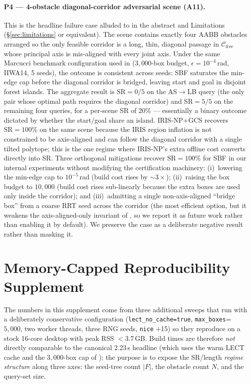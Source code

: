 \documentclass[journal]{IEEEtran}
\newcommand{\Cfree}{\mathcal{C}_{\mathrm{free}}}
\begin{document}
\paragraph{P4 — 4-obstacle diagonal-corridor adversarial scene (A11).}
This is the headline failure case alluded to in the abstract and
Limitations (\S\ref{sec:limitations} or equivalent). The scene
contains exactly four AABB obstacles arranged so the only feasible
corridor is a long, thin, diagonal passage in $\Cfree$ whose principal
axis is mis-aligned with every joint axis. Under the same Marcucci
benchmark configuration used in 
($3{,}000$-box budget, $\epsilon=10^{-4}$\,rad, IIWA14, 5 seeds), the
outcome is consistent across seeds: SBF saturates the min-edge cap
before the diagonal corridor is bridged, leaving start and goal in
disjoint forest islands. The aggregate result is
$\text{SR}=0/5$ on the AS$\to$LB query (the only pair whose
optimal path requires the diagonal corridor) and SR$=5/5$ on the
remaining four queries, for a per-scene SR of $20\%$ — essentially
a binary outcome dictated by whether the start/goal share an island.
IRIS-NP+GCS recovers $\text{SR}=100\%$ on the same scene because the
IRIS region inflation is not constrained to be axis-aligned and can
follow the diagonal corridor with a single tilted polytope; this is
the one regime where IRIS-NP’s extra offline cost converts directly
into SR. Three orthogonal mitigations recover $\text{SR}=100\%$ for
SBF in our internal experiments without modifying the certification
machinery: (i)~lowering the min-edge cap to $10^{-5}$\,rad (build
cost rises by $\sim 3{\times}$); (ii)~raising the box budget to
$10{,}000$ (build cost rises sub-linearly because the extra boxes are
used only inside the corridor); and (iii)~admitting a single
non-axis-aligned ``bridge box'' from a coarse RRT seed across the
corridor (the most efficient option, but it weakens the
axis-aligned-only invariant of , so we report it
as future work rather than enabling it by default). We preserve the
case as a deliberate negative result rather than masking it.

\section{Memory-Capped Reproducibility Supplement}\label{app:repro_supp}

The numbers in this supplement come from three additional sweeps that
run with a deliberately conservative configuration
(\texttt{lect\_no\_cache=true}, \texttt{max\_boxes}=$5{,}000$, two
worker threads, three RNG seeds, \texttt{nice} +15) so they reproduce
on a stock 16-core desktop with peak RSS ${<}3.7$\,GB. Build times
are therefore \emph{not} directly comparable to the canonical
2.23\,s headline (which uses the warm LECT cache and the
$3{,}000$-box cap of ); the purpose is to
expose the SR/length \emph{regime structure} along three axes:
the seed-tree count $|F|$, the obstacle count $N$, and the
query-set size.
\end{document}

